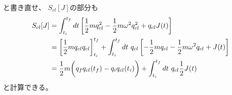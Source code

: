 と書き直せ、
$S_{cl} [J]$の部分も
\begin{align}
    S_{cl} [J]
    &=
    \int_{t_i}^{t_f} dt
    \left[
        \frac{1}{2}m
        \dot{q}_{cl}^2
    -
        \frac{1}{2} m \omega^2
        q_{cl}^2
    +
        q_{cl}
        J(t)
    \right]
\notag\\&=
    \left[
        \frac{1}{2}m
        q_{cl}
        \dot{q}_{cl}
    \right]_{t_i}^{t_f}
    +
    \int_{t_i}^{t_f} dt\ 
    q_{cl}
    \left[
    -
        \frac{1}{2} m
        \ddot{q}_{cl}
    -
        \frac{1}{2} m \omega^2
        q_{cl}
    +
        J(t)
    \right]
\notag\\&=
    \frac{1}{2} m
    \bigg(
        q_f
        \dot{q}_{cl}(t_f)
    -
        q_i
        \dot{q}_{cl}(t_i)
    \bigg)
    +
    \int_{t_i}^{t_f} dt\ 
        q_{cl}
        \frac{1}{2}
        J(t)
\label{classical action of harm osci with source}
\end{align}
と計算できる。

